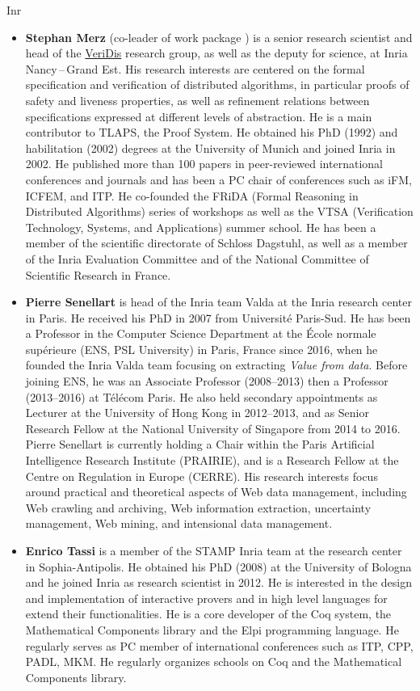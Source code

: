 \begin{sitedescription}{Inr}
\begin{itemize}
\item{\bf Stephan Merz} (co-leader of work package ) is a senior research
scientist and head of the \href{https://team.inria.fr/veridis/}{VeriDis}
research group, as well as the deputy for science, at Inria Nancy\,--\,Grand Est.
His research interests are centered on the formal specification and verification
of distributed algorithms, in particular proofs of safety and liveness
properties, as well as refinement relations between specifications expressed at
different levels of abstraction. He is a main contributor to TLAPS, the \tlaplus
Proof System. He obtained his PhD (1992) and habilitation (2002) degrees at the
University of Munich and joined Inria in 2002. He published more than 100 papers
in peer-reviewed international conferences and journals and has been a PC chair
of conferences such as iFM, ICFEM, and ITP. He co-founded the FRiDA (Formal
Reasoning in Distributed Algorithms) series of workshops as well as the VTSA
(Verification Technology, Systems, and Applications) summer school. He has been
a member of the scientific directorate of Schloss Dagstuhl, as well as a member
of the Inria Evaluation Committee and of the National Committee of Scientific
Research in France.

\item{\bf Pierre Senellart} is head of the Inria team Valda at the Inria
  research center in Paris. He
  received his PhD in 2007 from Université Paris-Sud. He has been a
    Professor in the Computer Science Department at the École normale
    supérieure (ENS, PSL University) in Paris, France since 2016, when he
    founded the Inria Valda team focusing on extracting \emph{Value from
    data}. Before joining ENS, he was an Associate Professor (2008–2013)
    then a Professor (2013–2016) at Télécom Paris. He also held secondary
    appointments as Lecturer at the University of Hong Kong in 2012–2013,
    and as Senior Research Fellow at the National University of Singapore
    from 2014 to 2016. Pierre Senellart is currently holding a Chair
    within the Paris Artificial Intelligence Research Institute
    (PRAIRIE), and is a Research Fellow at the Centre on Regulation in
    Europe (CERRE).
    His research interests
    focus around practical and theoretical aspects of Web data
    management, including Web crawling and archiving, Web information
    extraction, uncertainty management, Web mining, and intensional data
    management.

\item{\bf Enrico Tassi} is a member of the STAMP Inria team at the research
center in Sophia-Antipolis. He obtained his PhD (2008) at the University of
Bologna and he joined Inria as research scientist in 2012.
He is interested in the design and implementation of interactive
provers and in high level languages for extend their functionalities.
He is a core developer of the Coq system, the Mathematical Components library
and the Elpi programming language. He regularly serves as PC member of
international conferences such as ITP, CPP, PADL, MKM. He regularly organizes
schools on Coq and the Mathematical Components library.



\end{itemize}
\end{sitedescription}
